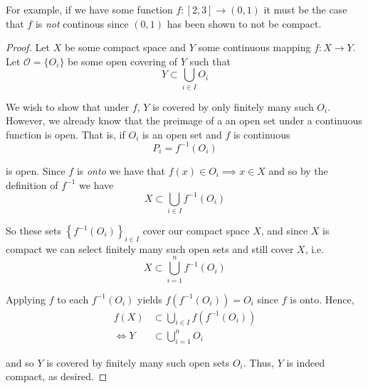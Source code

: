\documentclass[12pt]{article}
\newlength\tindent
\renewcommand{\indent}{\hspace*{\tindent}}
\begin{document}
\indent For example, if we have some function $f:[2,3]\to(0, 1)$ it must be the case that $f$ is {\em not} continous since $(0, 1)$ has been shown to not be compact.

\begin{proof} Let $X$ be some compact space and $Y$ some continuous mapping $f:X\to Y$. Let $\mathcal O = \{O_i\}$ be some open covering of $Y$ such that
\begin{equation*}
	Y \subset \bigcup_{i\in I} O_i
\end{equation*}

\indent We wish to show that under $f$, $Y$ is covered by only finitely many such $O_i$. However, we already know that the preimage of a an open set under a continuous function is open. That is, if $O_i$ is an open set and $f$ is continuous
\begin{equation*}
	P_i = f^{-1}(O_i)
\end{equation*}

is open. Since $f$ is {\em onto} we have that $f(x) \in O_i \implies x \in X$ and so by the definition of $f^{-1}$ we have
\begin{equation*}
	X \subset \bigcup_{i\in I} f^{-1}(O_i)
\end{equation*}

So these sets $\left\{ f^{-1}(O_i) \right\}_{i\in I}$ cover our compact space $X$, and since $X$ is compact we can select finitely many such open sets and still cover $X$, i.e.
\begin{equation*}
	X \subset \bigcup^n_{i = 1} f^{-1}(O_i)
\end{equation*}

Applying $f$ to each $f^{-1}(O_i)$ yields $f\left(f^{-1}(O_i)\right) = O_i$ since $f$ is onto. Hence,
\begin{align*}
	f(X) &\subset \bigcup_{i\in I} f\left(f^{-1}(O_i)\right) \\
	\iff Y &\subset \bigcup^n_{i = 1} O_i
\end{align*}

and so $Y$ is covered by finitely many such open sets $O_i$. Thus, $Y$ is indeed compact, as desired.
\end{proof}
\end{document}
